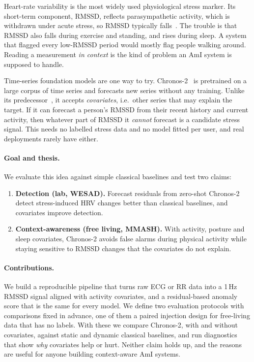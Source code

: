 \documentclass[11pt,a4paper]{article}
\begin{document}
Heart-rate variability is the most widely used physiological stress marker. Its short-term component, RMSSD, reflects parasympathetic activity, which is withdrawn under acute stress, so RMSSD typically falls~\cite{taskforce1996hrv,shaffer2017hrv,kim2018stress}. The trouble is that RMSSD also falls during exercise and standing, and rises during sleep. A system that flagged every low-RMSSD period would mostly flag people walking around. Reading a measurement \emph{in context} is the kind of problem an AmI system is supposed to handle.

Time-series foundation models are one way to try. Chronos-2~\cite{ansari2025chronos2} is pretrained on a large corpus of time series and forecasts new series without any training. Unlike its predecessor~\cite{ansari2024chronos}, it accepts \emph{covariates}, i.e.\ other series that may explain the target. If it can forecast a person's RMSSD from their recent history and current activity, then whatever part of RMSSD it \emph{cannot} forecast is a candidate stress signal. This needs no labelled stress data and no model fitted per user, and real deployments rarely have either.

\paragraph{Goal and thesis.} We evaluate this idea against simple classical baselines and test two claims:
\begin{enumerate}
  \item \textbf{Detection (lab, WESAD).} Forecast residuals from zero-shot Chronos-2 detect stress-induced HRV changes better than classical baselines, and covariates improve detection.
  \item \textbf{Context-awareness (free living, MMASH).} With activity, posture and sleep covariates, Chronos-2 avoids false alarms during physical activity while staying sensitive to RMSSD changes that the covariates do not explain.
\end{enumerate}

\paragraph{Contributions.} We build a reproducible pipeline that turns raw ECG or RR data into a 1\,Hz RMSSD signal aligned with activity covariates, and a residual-based anomaly score that is the same for every model. We define two evaluation protocols with comparisons fixed in advance, one of them a paired injection design for free-living data that has no labels. With these we compare Chronos-2, with and without covariates, against static and dynamic classical baselines, and run diagnostics that show \emph{why} covariates help or hurt. Neither claim holds up, and the reasons are useful for anyone building context-aware AmI systems.
\end{document}
